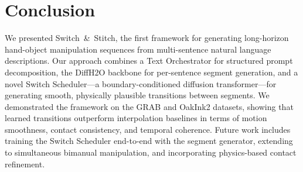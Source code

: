 \documentclass[runningheads]{llncs}
\begin{document}
\section{Conclusion}
\label{sec:conclusion}

We presented Switch~\&~Stitch, the first framework for generating long-horizon hand-object manipulation sequences from multi-sentence natural language descriptions.
Our approach combines a Text Orchestrator for structured prompt decomposition, the DiffH2O backbone for per-sentence segment generation, and a novel Switch Scheduler---a boundary-conditioned diffusion transformer---for generating smooth, physically plausible transitions between segments.
We demonstrated the framework on the GRAB and OakInk2 datasets, showing that learned transitions outperform interpolation baselines in terms of motion smoothness, contact consistency, and temporal coherence.
Future work includes training the Switch Scheduler end-to-end with the segment generator, extending to simultaneous bimanual manipulation, and incorporating physics-based contact refinement.




\end{document}
